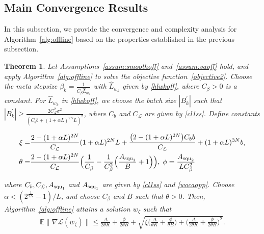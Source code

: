 \documentclass{osudissert96}
\newtheorem{theorem}{Theorem}
\begin{document}
\subsection*{Main Convergence Results}
In this subsection, we provide the convergence and complexity  analysis for Algorithm~\ref{alg:offline} based on the properties established in the previous subsection. 
\begin{theorem}\label{mainth:offline} 
	Let Assumptions~\ref{assum:smoothoff} and~\ref{assum:vaoff} hold, and apply Algorithm~\ref{alg:offline} to solve the objective function~\cref{objective2}. 
	Choose the meta stepsize $\beta_k = \frac{1}{C_\beta \widehat L_{w_k}} $ with  $\widehat L_{w_k}$  given by \cref{hlwkoff}, where $C_\beta>0$ is a constant. For $\widehat L_{w_k}$ in \cref{hlwkoff}, we choose  the batch size $|B_k^\prime| $ such that  $|B_k^\prime| \geq \frac{2C^2_\mathcal{L}\sigma^2}{( C_b b + (1+\alpha L)^{2N} L)^2}$, where $C_b$ and $C_\mathcal{L}$ are given by \cref{cl1ss}.
	Define constants 
	\begin{small}
	\begin{align}\label{offline:constants}
	\xi = &\frac{2-(1+\alpha L)^{2N}}{C_\mathcal{L}} (1+\alpha L)^{2N}L+\frac{ \big(2-(1+\alpha L)^{2N}\big) C_b b }{C_\mathcal{L}} +(1+\alpha L)^{3N}b, \nonumber
	\\ %
	\theta = &	\frac{2-(1+\alpha L)^{2N}}{C_\mathcal{L}} \Big(  \frac{1}{C_\beta}  - \frac{1}{C_\beta^2}\Big( \frac{A_{\text{\normalfont squ}_1}}{B}+1\Big)\Big), \; \phi = \frac{A_{\text{\normalfont squ}_2}}{LC_\beta^2}
	\end{align}
	\end{small}
	\hspace{-0.15cm}where $C_b,C_{\mathcal{L}}, A_{\text{\normalfont squ}_1}$ and $A_{\text{\normalfont squ}_1}$ are given by \cref{cl1ss} and \cref{wocaopp}. Choose  $\alpha < (2^{\frac{1}{2N}} - 1)/L$, and choose $C_\beta$ and $B$ such that $\theta >0$. Then,  Algorithm~\ref{alg:offline} attains a solution $w_{\zeta}$  such that 
	\begin{align}\label{iopnn}
	\mathbb{E}\|\nabla \mathcal{L}(w_\zeta)\| \leq \frac{\Delta}{2\theta K} +\frac{\phi}{2\theta B} + \sqrt{ \xi \Big(\frac{\Delta}{\theta K} +\frac{\phi}{\theta B}\Big) + \Big(\frac{\Delta}{2\theta K} +\frac{\phi}{2\theta B}\Big)^2 }.
	\end{align}
\end{theorem}
\end{document}
